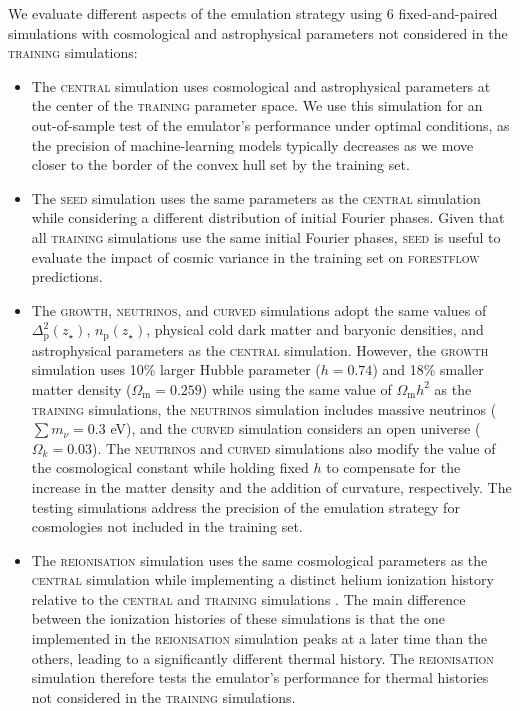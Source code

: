 \documentclass[fleqn,usenatbib]{mnras}
\newcommand{\forestflow}{\textsc{forestflow}\xspace}
\newcommand{\lacehc}{\textsc{training}\xspace}
\newcommand{\simseed}{\textsc{seed}\xspace}
\newcommand{\simigm}{\textsc{reionisation}\xspace}
\newcommand{\simcurved}{\textsc{curved}\xspace}
\newcommand{\simh}{\textsc{growth}\xspace}
\newcommand{\simnu}{\textsc{neutrinos}\xspace}
\newcommand{\simcentral}{\textsc{central}\xspace}
\begin{document}
We evaluate different aspects of the emulation strategy using 6 fixed-and-paired simulations with cosmological and astrophysical parameters not considered in the \lacehc simulations:
%
\begin{itemize}
    \item The \simcentral simulation uses cosmological and astrophysical parameters at the center of the \lacehc parameter space. We use this simulation for an out-of-sample test of the emulator's performance under optimal conditions, as the precision of machine-learning models typically decreases as we move closer to the border of the convex hull set by the training set.
    
    \item The \simseed simulation uses the same parameters as the \simcentral simulation while considering a different distribution of initial Fourier phases. Given that all \lacehc simulations use the same initial Fourier phases, \simseed is useful to evaluate the impact of cosmic variance in the training set on \forestflow predictions.
    
    \item The \simh, \simnu, and \simcurved simulations adopt the same values of $\Delta^2_\mathrm{p}(z_\star)$, $n_\mathrm{p}(z_\star)$, physical cold dark matter and baryonic densities, and astrophysical parameters as the \simcentral simulation. However, the \simh simulation uses 10\% larger Hubble parameter ($h=0.74$) and 18\% smaller matter density ($\Omega_\mathrm{m}=0.259$) while using the same value of $\Omega_\mathrm{m} h^2$ as the \lacehc simulations, the \simnu simulation includes massive neutrinos ($\sum m_\nu=0.3$ eV), and the \simcurved simulation considers an open universe ($\Omega_k=0.03$). The \simnu and \simcurved simulations also modify the value of the cosmological constant while holding fixed $h$ to compensate for the increase in the matter density and the addition of curvature, respectively. The testing simulations address the precision of the emulation strategy for cosmologies not included in the training set.

    \item The \simigm simulation uses the same cosmological parameters as the \simcentral simulation while implementing a distinct helium ionization history relative to the \simcentral and \lacehc simulations \citep{puchwein2019ConsistentModellingMetagalactic}. The main difference between the ionization histories of these simulations is that the one implemented in the \simigm simulation peaks at a later time than the others, leading to a significantly different thermal history. The \simigm simulation therefore tests the emulator's performance for thermal histories not considered in the \lacehc simulations.
\end{itemize}
\end{document}
